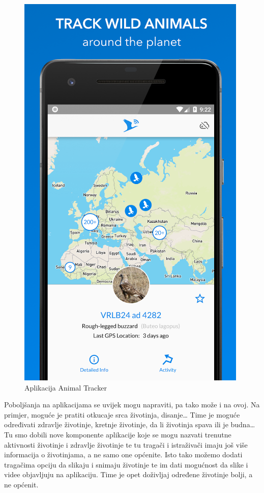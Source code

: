 	\begin{figure}[H]
		\includegraphics[scale=0.4]{slike/animal_tracker.png} %
		\centering
		\caption{Aplikacija Animal Tracker}
		\label{fig:animal_tracker}
	\end{figure}
	

	Poboljšanja na aplikacijama se uvijek mogu napraviti, pa tako može i na ovoj. Na primjer, moguće je pratiti otkucaje srca životinja, disanje\dots 
	Time je moguće određivati zdravlje životinje, kretnje životinje, da li životinja spava ili je budna\dots
	Tu smo dobili nove komponente aplikacije koje se mogu nazvati trenutne aktivnosti životinje i zdravlje životinje te tu tragači i istraživači imaju još više informacija o životinjama, a ne samo one općenite.
	Isto tako možemo dodati tragačima opciju da slikaju i snimaju životinje te im dati mogućnost da slike i videe objavljuju na aplikaciju. Time je opet doživljaj određene životinje bolji, a ne općenit.

	